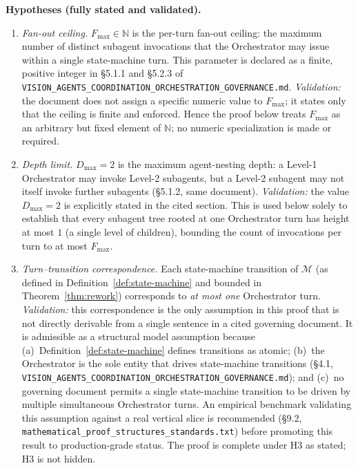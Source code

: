 \documentclass[12pt]{article}
\theoremstyle{definition}
\newcommand{\code}[1]{\texttt{#1}}
\newcommand{\VisionGov}{\code{VISION\_AGENTS\_\allowbreak COORDINATION\_\allowbreak ORCHESTRATION\_\allowbreak GOVERNANCE.md}}
\newcommand{\ProofStd}{\code{mathematical\_proof\_\allowbreak structures\_standards.txt}}
\begin{document}
\medskip
\noindent\textbf{Hypotheses (fully stated and validated).}
\begin{enumerate}
    \item[H1] \emph{Fan-out ceiling.}  $F_{\max} \in \mathbb{N}$ is the
              per-turn fan-out ceiling: the maximum number of distinct
              subagent invocations that the Orchestrator may issue within
              a single state-machine turn.  This parameter is declared as
              a finite, positive integer in \S5.1.1 and \S5.2.3 of
              \VisionGov{}.  \emph{Validation:} the document does
              not assign a specific numeric value to $F_{\max}$; it states
              only that the ceiling is finite and enforced.  Hence the
              proof below treats $F_{\max}$ as an arbitrary but fixed
              element of $\mathbb{N}$; no numeric specialization is made
              or required.

    \item[H2] \emph{Depth limit.}  $D_{\max} = 2$ is the maximum
              agent-nesting depth: a Level-1 Orchestrator may invoke
              Level-2 subagents, but a Level-2 subagent may not itself
              invoke further subagents (\S5.1.2, same document).
              \emph{Validation:} the value $D_{\max}=2$ is explicitly
              stated in the cited section.  This is used below solely to
              establish that every subagent tree rooted at one
              Orchestrator turn has height at most $1$ (a single level of
              children), bounding the count of invocations per turn to
              at most $F_{\max}$.

    \item[H3] \emph{Turn--transition correspondence.}  Each
              state-machine transition of $\mathcal{M}$ (as defined in
              Definition~\ref{def:state-machine} and bounded in
              Theorem~\ref{thm:rework}) corresponds to \emph{at most one}
              Orchestrator turn.
              \emph{Validation:} this correspondence is the only
              assumption in this proof that is not directly derivable from
              a single sentence in a cited governing document.  It is
              admissible as a structural model assumption because
              (a)~Definition~\ref{def:state-machine} defines transitions
              as atomic; (b)~the Orchestrator is the sole entity that
              drives state-machine transitions (\S4.1,
              \VisionGov{}); and (c)~no governing document
              permits a single state-machine transition to be driven by
              multiple simultaneous Orchestrator turns.  An empirical
              benchmark validating this assumption against a real vertical
              slice is recommended (\S9.2,
              \ProofStd{})
              before promoting this result to production-grade status.
              The proof is complete under H3 as stated; H3 is not hidden.


\end{enumerate}
\end{document}
